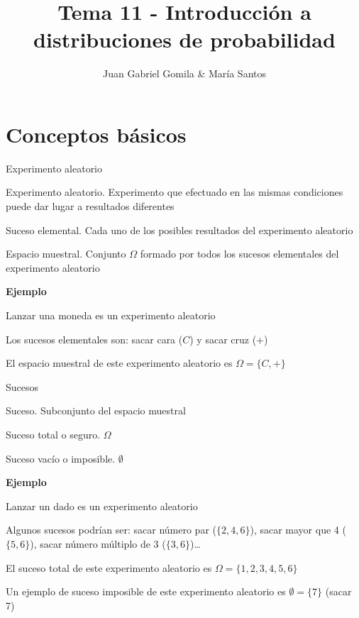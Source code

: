 \documentclass[
  ignorenonframetext,
]{beamer}
\title{Tema 11 - Introducción a distribuciones de probabilidad}
\author{Juan Gabriel Gomila \& María Santos}
\date{}
\begin{document}
\frame{\titlepage}

\hypertarget{conceptos-buxe1sicos}{%
\section{Conceptos básicos}\label{conceptos-buxe1sicos}}

\begin{frame}{Experimento aleatorio}
\protect\hypertarget{experimento-aleatorio}{}

Experimento aleatorio. Experimento que efectuado en las mismas
condiciones puede dar lugar a resultados diferentes

Suceso elemental. Cada uno de los posibles resultados del experimento
aleatorio

Espacio muestral. Conjunto \(\Omega\) formado por todos los sucesos
elementales del experimento aleatorio

\textbf{Ejemplo}

Lanzar una moneda es un experimento aleatorio

Los sucesos elementales son: sacar cara (\(C\)) y sacar cruz (\(+\))

El espacio muestral de este experimento aleatorio es
\(\Omega = \{C,+\}\)

\end{frame}

\begin{frame}{Sucesos}
\protect\hypertarget{sucesos}{}

Suceso. Subconjunto del espacio muestral

Suceso total o seguro. \(\Omega\)

Suceso vacío o imposible. \(\emptyset\)

\textbf{Ejemplo}

Lanzar un dado es un experimento aleatorio

Algunos sucesos podrían ser: sacar número par (\(\{2,4,6\}\)), sacar
mayor que 4 (\(\{5,6\}\)), sacar número múltiplo de 3
(\(\{3,6\}\))\ldots{}

El suceso total de este experimento aleatorio es
\(\Omega = \{1,2,3,4,5,6\}\)

Un ejemplo de suceso imposible de este experimento aleatorio es
\(\emptyset = \{7\}\) (sacar 7)

\end{frame}
\end{document}
